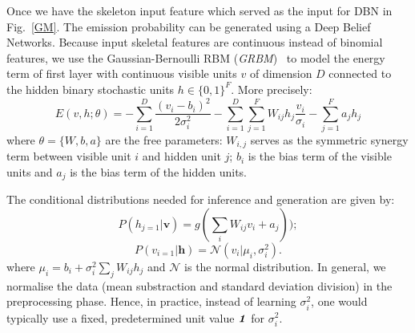 Once we have the skeleton input feature \skfeature{} which served as the input \randomvariableSK{} for DBN in Fig.~\ref{GM}. The emission probability \emissionprob{} can be generated using a Deep Belief Networks.
Because input skeletal features \skfeature{} are continuous instead of binomial features, we use the Gaussian-Bernoulli RBM (\emph{GRBM})~\cite{salakhutdinov2009learning} to model the energy term of first layer with continuous visible units $v$ of dimension $D$ connected to the hidden binary stochastic units $h\in \{0,1\}^F$. More precisely:
\begin{equation}
    E(v,h;\theta) =-\sum^D_{i=1} \frac{(v_i-b_i)^2}{2\sigma_i^2} -\sum^D_{i=1} \sum^F_{j=1} W_{ij}  h_j \frac{v_i}{\sigma_i}- \sum^F_{j=1}a_jh_j
\label{GRBMenergy}
\end{equation}
where $\theta=\{W,b,a\}$ are the free parameters: $W_{i,j}$ serves as the symmetric synergy term between visible unit $i$ and hidden unit $j$; $b_i$ is the bias term of the visible units and $a_j$ is the bias term of the hidden units.

The conditional distributions needed for inference and generation are given by:
\begin{equation}
    P(h_{j=1}|\textbf{v})=g(\sum_i W_{ij}v_i+a_j));
\end{equation}
\begin{equation}
    P(v_{i=1}|\textbf{h})=\mathscr{N}(v_i|\mu_i,\sigma_i^2).
\end{equation}
where $\mu_i=b_i+\sigma_i^2 \sum_j W_{ij} h_j$ and $\mathscr{N}$ is the normal distribution. In general, we normalise the data (mean substraction and standard deviation division) in the preprocessing phase. Hence, in practice, instead of learning $\sigma_i^2$, one would typically use a fixed, predetermined unit value $\textbf{\emph{1}}$ for $\sigma_i^2$.

